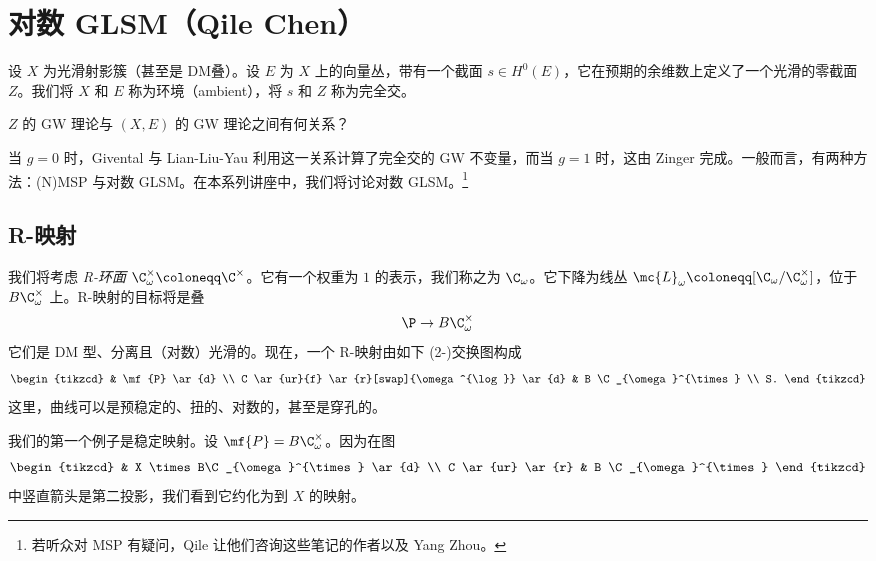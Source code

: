 \section{对数 GLSM（Qile Chen）}%
\label{sec:Log GLSM (Qile Chen)}

设 \(X\) 为光滑射影簇（甚至是 DM叠）。设 \(E\) 为 \(X\) 上的向量丛，带有一个截面 \(s \in H^0(E)\)，它在预期的余维数上定义了一个光滑的零截面 \(Z\)。我们将 \(X\) 和 \(E\) 称为环境（ambient），将 \(s\) 和 \(Z\) 称为完全交。

\begin{quest}
    \(Z\) 的 GW 理论与 \((X, E)\) 的 GW 理论之间有何关系？
\end{quest}

当 \(g = 0\) 时，Givental 与 Lian-Liu-Yau 利用这一关系计算了完全交的 GW 不变量，而当 \(g = 1\) 时，这由 Zinger 完成。一般而言，有两种方法：(N)MSP 与对数 GLSM。在本系列讲座中，我们将讨论对数 GLSM。\footnote{若听众对 MSP 有疑问，Qile 让他们咨询这些笔记的作者以及 Yang Zhou。}

\subsection{R-映射}%
\label{sub:R-maps}

我们将考虑 \textit{R-环面} \(\C^{\times}_{\omega} \coloneqq \C^{\times}\)。它有一个权重为 \(1\) 的表示，我们称之为 \(\C_{\omega}\)。它下降为线丛 \(\mc{L}_{\omega} \coloneqq [\C_{\omega} / \C^{\times}_{\omega}]\)，位于 \(B \C_{\omega}^{\times}\) 上。R-映射的目标将是叠
\[ \P \to B \C^{\times}_{\omega} \]
它们是 DM 型、分离且（对数）光滑的。现在，一个 R-映射由如下 (2-)交换图构成
\begin{equation*}
\begin{tikzcd}
    & \mf{P} \ar{d} \\
    C \ar{ur}{f} \ar{r}[swap]{\omega^{\log}} \ar{d} & B \C_{\omega}^{\times} \\
    S.
\end{tikzcd}
\end{equation*}
这里，曲线可以是预稳定的、扭的、对数的，甚至是穿孔的。

\begin{exm}
    我们的第一个例子是稳定映射。设 \(\mf{P} = B\C_{\omega}^{\times}\)。因为在图
    \begin{equation*}
    \begin{tikzcd}
        & X \times B\C_{\omega}^{\times} \ar{d} \\
        C \ar{ur} \ar{r} & B \C_{\omega}^{\times}
    \end{tikzcd}
    \end{equation*}
    中竖直箭头是第二投影，我们看到它约化为到 \(X\) 的映射。
\end{exm}

